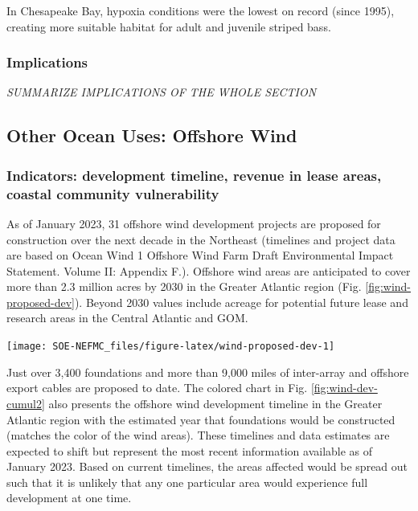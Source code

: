 \documentclass[
  10pt,
]{article}
\let\origfigure\figure
\let\endorigfigure\endfigure
\renewenvironment{figure}[1][2] {
    \expandafter\origfigure\expandafter[H]
} {
    \endorigfigure
}
\begin{document}
In Chesapeake Bay, hypoxia conditions were the lowest on record (since 1995), creating more suitable habitat for adult and juvenile striped bass.

\hypertarget{implications-6}{%
\subsubsection{Implications}\label{implications-6}}

\emph{SUMMARIZE IMPLICATIONS OF THE WHOLE SECTION}

\hypertarget{other-ocean-uses-offshore-wind}{%
\subsection{Other Ocean Uses: Offshore Wind}\label{other-ocean-uses-offshore-wind}}

\hypertarget{indicators-development-timeline-revenue-in-lease-areas-coastal-community-vulnerability}{%
\subsubsection{Indicators: development timeline, revenue in lease areas, coastal community vulnerability}\label{indicators-development-timeline-revenue-in-lease-areas-coastal-community-vulnerability}}

As of January 2023, 31 offshore wind development projects are proposed for construction over the next decade in the Northeast (timelines and project data are based on Ocean Wind 1 Offshore Wind Farm Draft Environmental Impact Statement. Volume II: Appendix F.). Offshore wind areas are anticipated to cover more than 2.3 million acres by 2030 in the Greater Atlantic region (Fig. \ref{fig:wind-proposed-dev}). Beyond 2030 values include acreage for potential future lease and research areas in the Central Atlantic and GOM.

\begin{figure}

{\centering \texttt{[image: SOE-NEFMC\_files/figure-latex/wind-proposed-dev-1]} 

}

\caption{Proposed wind development on the northeast shelf.}\label{fig:wind-proposed-dev}
\end{figure}

Just over 3,400 foundations and more than 9,000 miles of inter-array and offshore export cables are proposed to date. The colored chart in Fig. \ref{fig:wind-dev-cumul2} also presents the offshore wind development timeline in the Greater Atlantic region with the estimated year that foundations would be constructed (matches the color of the wind areas). These timelines and data estimates are expected to shift but represent the most recent information available as of January 2023. Based on current timelines, the areas affected would be spread out such that it is unlikely that any one particular area would experience full development at one time.
\end{document}
